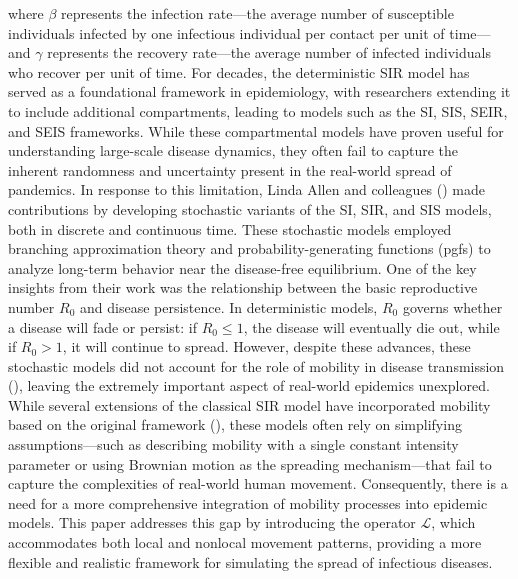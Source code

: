 \documentclass[sn-basic]{sn-jnl}%
\theoremstyle{thmstyleone}%
\theoremstyle{thmstyletwo}%
\theoremstyle{thmstylethree}%
\numberwithin{equation}{theorem}
\begin{document}
where $\beta$ represents the infection rate—the average number of susceptible individuals infected by one infectious individual per contact per unit of time—and $\gamma$ represents the recovery rate—the average number of infected individuals who recover per unit of time. For decades, the deterministic SIR model has served as a foundational framework in epidemiology, with researchers extending it to include additional compartments, leading to models such as the SI, SIS, SEIR, and SEIS frameworks. While these compartmental models have proven useful for understanding large-scale disease dynamics, they often fail to capture the inherent randomness and uncertainty present in the real-world spread of pandemics. In response to this limitation, Linda Allen and colleagues (\citep{allen1994,allen2008}) made  contributions by developing stochastic variants of the SI, SIR, and SIS models, both in discrete and continuous time. These stochastic models employed branching approximation theory and probability-generating functions (pgfs) to analyze long-term behavior near the disease-free equilibrium. One of the key insights from their work was the relationship between the basic reproductive number \(R_0\) and disease persistence. In deterministic models, \(R_0\) governs whether a disease will fade or persist: if \(R_0 \leq 1\), the disease will eventually die out, while if \(R_0 > 1\), it will continue to spread. However, despite these advances, these stochastic models did not account for the role of mobility in disease transmission  (\citep{allen1994,allen2008,keeling2007modeling}), leaving the extremely important aspect of real-world epidemics unexplored. While several extensions of the classical SIR model have incorporated mobility based on the original framework (\citep{gai2020localized, chinviriyasit2010numerical, centres2024diffusion}), these models often rely on simplifying assumptions—such as describing mobility with a single constant intensity parameter or using Brownian motion as the spreading mechanism—that fail to capture the complexities of real-world human movement. Consequently, there is a need for a more comprehensive integration of mobility processes into epidemic models. This paper addresses this gap by introducing the operator $\mathcal{L}$, which accommodates both local and nonlocal movement patterns, providing a more flexible and realistic framework for simulating the spread of infectious diseases.
\end{document}
